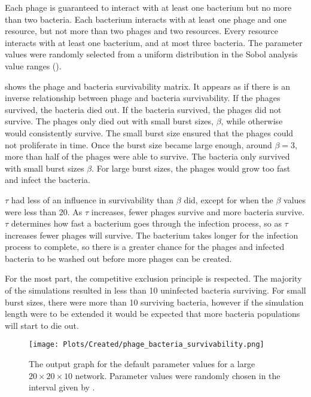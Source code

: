 Each phage is guaranteed to interact with at least one bacterium but no more than two bacteria. 
Each bacterium interacts with at least one phage and one resource, but not more than two phages and two resources. 
Every resource interacts with at least one bacterium, and at most three bacteria. 
The parameter values were randomly selected from a uniform distribution in the Sobol analysis value ranges (). 

 shows the phage and bacteria survivability matrix. 
It appears as if there is an inverse relationship between phage and bacteria survivability. 
If the phages survived, the bacteria died out. 
If the bacteria survived, the phages did not survive. 
The phages only died out with small burst sizes, $\beta$, while otherwise would consistently survive. The small burst size ensured that the phages could not proliferate in time. 
Once the burst size became large enough, around $\beta = 3$, more than half of the phages were able to survive. 
The bacteria only survived with small burst sizes $\beta$. 
For large burst sizes, the phages would grow too fast and infect the bacteria. 

$\tau$ had less of an influence in survivability than $\beta$ did, except for when the $\beta$ values were less than 20. 
As $\tau$ increases, fewer phages survive and more bacteria survive. 
$\tau$ determines how fast a bacterium goes through the infection process, so as $\tau$ increases fewer phages will survive. 
The bacterium takes longer for the infection process to complete, so there is a greater chance for the phages and infected bacteria to be washed out before more phages can be created. 

For the most part, the competitive exclusion principle is respected. 
The majority of the simulations resulted in less than 10 uninfected bacteria surviving. 
For small burst sizes, there were more than 10 surviving bacteria, however if the simulation length were to be extended it would be expected that more bacteria populations will start to die out. 

\begin{figure}[]
    \texttt{[image: Plots/Created/phage\_bacteria\_survivability.png]}
    \centering
    \caption{
        The output graph for the default parameter values for a large $20\times 20 \times 10$ network. 
        Parameter values were randomly chosen in the interval given by . 
    \label{fig:created:survivability}
    }
\end{figure}